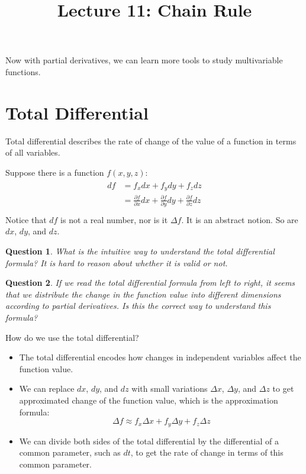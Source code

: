 \documentclass{article}
\title{Lecture 11: Chain Rule}
\author{}
\date{}
\newtheorem*{question}{Question}
\begin{document}
    
\maketitle

Now with partial derivatives, we can learn more tools to study multivariable 
functions.

\section{Total Differential}

Total differential describes the rate of change of the value of a function in 
terms of all variables.

Suppose there is a function $f(x, y, z)$:
\begin{gather*}
  \begin{split}
    df &= f_xdx + f_ydy + f_zdz \\
       &= \frac{\partial f}{\partial x}dx + \frac{\partial f}{\partial y}dy + \frac{\partial f}{\partial z}dz \\
  \end{split}
\end{gather*}
Notice that $df$ is not a real number, nor is it $\Delta f$. It is an abstract 
notion. So are $dx$, $dy$, and $dz$.

\begin{question}
  What is the intuitive way to understand the total differential formula? It is 
  hard to reason about whether it is valid or not.
\end{question}

\begin{question}
  If we read the total differential formula from left to right, it seems that we 
  distribute the change in the function value into different dimensions 
  according to partial derivatives. Is this the correct way to understand this 
  formula?
\end{question}

How do we use the total differential?
\begin{itemize}
  \item The total differential encodes how changes in independent variables 
    affect the function value.
  \item We can replace $dx$, $dy$, and $dz$ with small variations $\Delta x$, 
    $\Delta y$, and $\Delta z$ to get approximated change of the function value, 
    which is the approximation formula:
    \begin{equation*}
      \Delta f \approx f_x \Delta x + f_y \Delta y + f_z \Delta z
    \end{equation*}
  \item We can divide both sides of the total differential by the differential 
    of a common parameter, such as $dt$, to get the rate of change in terms of 
    this common parameter.
\end{itemize}
\end{document}
